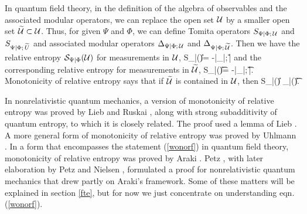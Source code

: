 \documentclass[12pt]{article}
\def\ra{\rangle}
\def\la{\langle}
\def\S{{\mathcal S}}
\numberwithin{equation}{section}
\begin{document}
In quantum field theory,  in the definition of the algebra of observables and the associated
modular operators, we can replace the open set ${\mathcal U}$ by a smaller open set $\t \U\subset \U$.     Thus, for given $\Psi$ and $\Phi$, we can define Tomita operators $S_{\Psi|\Phi;\,{\mathcal U}}$ and $S_{\Psi|\Phi;\,\t U}$ and associated
modular operators $\Delta_{\Psi|\Phi;\,{\mathcal U}}$ and $\Delta_{\Psi|\Phi;\,\t\U}$.   Then we have the relative entropy $\S_{\Psi|\Phi}(\U)$ for measurements in ${\mathcal U}$,
\be\label{zoonorf}\S_{\Psi|\Phi}(\U)= -\la\Psi|\log \Delta_{\Psi|\Phi;\,\U}|\Psi\ra \ee 
and the corresponding relative entropy for measurements in $\t\U$,
\be\label{xonorf}\S_{\Psi|\Phi}(\t\U)= -\la\Psi|\log \Delta_{\Psi|\Phi;\,\t\U}|\Psi\ra. \ee 
Monotonicity of relative entropy says that if $\t\U$ is contained in ${\mathcal U}$, then 
\be\label{wonorf}\S_{\Psi|\Phi}(\U) \geq \S_{\Psi|\Phi}(\t\U). \ee




In nonrelativistic quantum mechanics, a version of monotonicity of relative entropy was proved by Lieb and Ruskai \cite{LiebRuskai}, along
with strong subadditivity of quantum entropy, to which it is closely related.  The proof used a lemma of Lieb \cite{Lieb}.  A
 more general form of monotonicity of relative entropy was proved by Uhlmann \cite{Uhlmann}.  In a form that encompasses the statement (\ref{wonorf}) in quantum field
theory, monotonicity of relative entropy was proved by Araki \cite{Araki,Araki2}.
  Petz \cite{Petz}, with later elaboration by Petz and Nielsen \cite{PetzNielsen},
formulated a proof for nonrelativistic quantum mechanics that drew partly on Araki's framework.   Some of these matters will be explained in section \ref{fte},
but for now we just concentrate on understanding eqn. (\ref{wonorf}).
\end{document}

